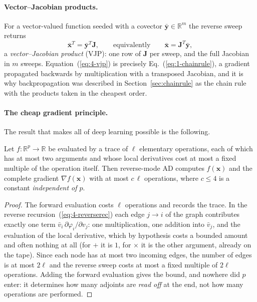 \paragraph{Vector--Jacobian products.}
For a vector-valued function seeded with a covector $\bar{\bm{y}}\in\mathbb{R}^{m}$
the reverse sweep returns
\begin{equation}
  \bar{\bm{x}}^{T} = \bar{\bm{y}}^{T}\bm{J},
  \qquad\text{equivalently}\qquad
  \bar{\bm{x}} = \bm{J}^{T}\bar{\bm{y}} ,
  \label{eq:4-vjp}
\end{equation}
a \emph{vector--Jacobian product} (VJP): one row of $\bm{J}$ per sweep, and
the full Jacobian in $m$ sweeps.  Equation~(\ref{eq:4-vjp}) is precisely
Eq.~(\ref{eq:1-chainrule}), a gradient propagated backwards by multiplication
with a transposed Jacobian, and it is why backpropagation was described in
Section~\ref{sec:chainrule} as the chain rule with the products taken in the
cheapest order.

\paragraph{The cheap gradient principle.}
The result that makes all of deep learning possible is the following.

\begin{proposition}
\label{prop:4-cheapgradient}
Let $f:\mathbb{R}^{p}\to\mathbb{R}$ be evaluated by a trace of $\ell$
elementary operations, each of which has at most two arguments and whose
local derivatives cost at most a fixed multiple of the operation itself.
Then reverse-mode AD computes $f(\bm{x})$ and the complete gradient
$\nabla f(\bm{x})$ with at most $c\,\ell$ operations, where $c\le4$ is a
constant \emph{independent of $p$}.
\end{proposition}

\begin{proof}
The forward evaluation costs $\ell$ operations and records the trace.  In the
reverse recursion~(\ref{eq:4-reverserec}) each edge $j\to i$ of the graph
contributes exactly one term $\bar v_i\,\partial\varphi_i/\partial v_j$: one
multiplication, one addition into $\bar v_j$, and the evaluation of the local
derivative, which by hypothesis costs a bounded amount and often nothing at
all (for $+$ it is $1$, for $\times$ it is the other argument, already on the
tape).  Since each node has at most two incoming edges, the number of edges is
at most $2\ell$ and the reverse sweep costs at most a fixed multiple of $2\ell$
operations.  Adding the forward evaluation gives the bound, and nowhere did
$p$ enter: it determines how many adjoints are \emph{read off} at the end,
not how many operations are performed.
\end{proof}

